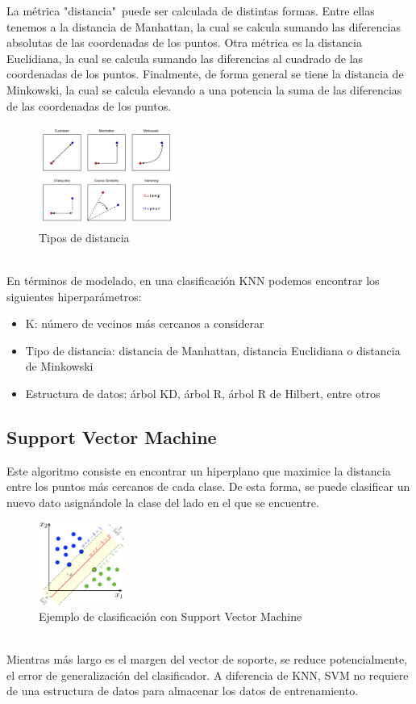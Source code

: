 \documentclass[conference]{IEEEtran}
\begin{document}
La métrica "distancia"\ puede ser calculada de distintas formas. Entre ellas tenemos a 
la distancia de Manhattan, la cual se calcula sumando las diferencias absolutas de las coordenadas de los puntos.
Otra métrica es la distancia Euclidiana, la cual se calcula sumando las diferencias al cuadrado de las coordenadas de los puntos.
Finalmente, de forma general se tiene la distancia de Minkowski, la cual se calcula elevando a una potencia la suma de las diferencias de las coordenadas de los puntos.
\begin{figure}[ht]
    \centering
    \includegraphics[width=0.40\textwidth]{images/distances.png}
    \caption{Tipos de distancia}
    \label{fig:distance_types}
\end{figure}
\\
En términos de modelado, en una clasificación KNN podemos encontrar los siguientes hiperparámetros:
\begin{itemize}
    \item K: número de vecinos más cercanos a considerar
    \item Tipo de distancia: distancia de Manhattan, distancia Euclidiana o distancia de Minkowski
    \item Estructura de datos: árbol KD, árbol R, árbol R de Hilbert, entre otros
\end{itemize}
\subsection{Support Vector Machine}
Este algoritmo consiste en encontrar un hiperplano que maximice la distancia entre los puntos más cercanos de cada clase.
De esta forma, se puede clasificar un nuevo dato asignándole la clase del lado en el que se encuentre.
\begin{figure}[ht]
    \centering
    \includegraphics[width=0.25\textwidth]{images/svm.png}
    \caption{Ejemplo de clasificación con Support Vector Machine}
    \label{fig:svm}
\end{figure}
\\
Mientras más largo es el margen del vector de soporte, se reduce potencialmente, el error de generalización del clasificador.
A diferencia de KNN, SVM no requiere de una estructura de datos para almacenar los datos de entrenamiento.
\end{document}

